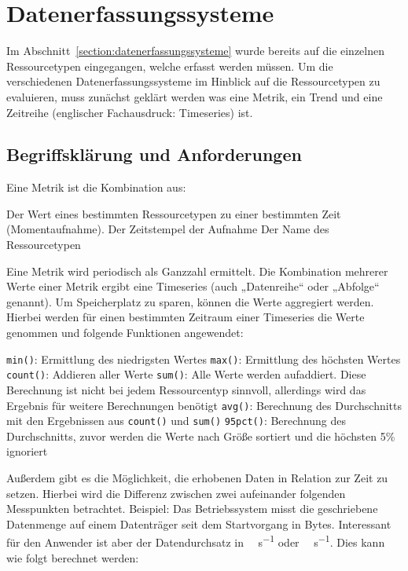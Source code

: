 \section{Datenerfassungssysteme}
Im Abschnitt~\ref{section:datenerfassungssysteme} wurde bereits auf die
einzelnen Ressourcetypen eingegangen, welche erfasst werden müssen. Um die
verschiedenen Datenerfassungssysteme im Hinblick auf die Ressourcetypen zu
evaluieren, muss zunächst geklärt werden was eine Metrik, ein Trend und eine
Zeitreihe (englischer Fachausdruck: Timeseries) ist.
\tm%

\subsection{Begriffsklärung und Anforderungen}
\label{section:Begriffserklärung}
Eine Metrik ist die Kombination aus:

\begin{outline}
  \1 Der Wert eines bestimmten Ressourcetypen zu einer bestimmten Zeit
  (Momentaufnahme).
  \1 Der Zeitstempel der Aufnahme
  \1 Der Name des Ressourcetypen
\end{outline}

Eine Metrik wird periodisch als Ganzzahl ermittelt. Die Kombination mehrerer
Werte einer Metrik ergibt eine Timeseries (auch „Datenreihe“ oder „Abfolge“
genannt). Um Speicherplatz zu sparen, können die Werte aggregiert werden.
Hierbei werden für einen bestimmten Zeitraum einer Timeseries die Werte
genommen und folgende Funktionen angewendet:

\begin{outline}
  \1 \lstinline|min()|: Ermittlung des niedrigsten Wertes
  \1 \lstinline|max()|: Ermittlung des höchsten Wertes
  \1 \lstinline|count()|: Addieren aller Werte
  \1 \lstinline|sum()|: Alle Werte werden aufaddiert. Diese Berechnung ist
  nicht bei jedem Ressourcentyp sinnvoll, allerdings wird das Ergebnis für
  weitere Berechnungen benötigt
  \1 \lstinline|avg()|: Berechnung des Durchschnitts mit den Ergebnissen aus
  \lstinline|count()| und \lstinline|sum()|
  \1 \lstinline|95pct()|: Berechnung des Durchschnitts, zuvor werden die Werte
  nach Größe sortiert und die höchsten 5\% ignoriert
\end{outline}

Außerdem gibt es die Möglichkeit, die erhobenen Daten in Relation zur Zeit zu
setzen. Hierbei wird die Differenz zwischen zwei aufeinander folgenden
Messpunkten betrachtet.  Beispiel: Das Betriebssystem misst die geschriebene
Datenmenge auf einem Datenträger seit dem Startvorgang in Bytes. Interessant
für den Anwender ist aber der Datendurchsatz in \si{\mega\byte\per\second} oder
\si{\giga\byte\per\second}. Dies kann wie folgt berechnet werden:

